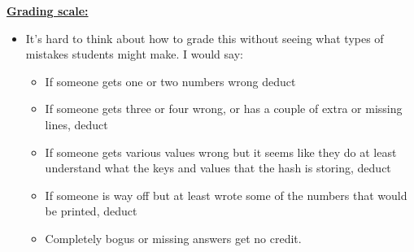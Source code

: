 \documentclass[11pt,fleqn]{article}
\begin{document}
\begin{enumerate}
          \vspace{-2.5mm}

          \begin{info}{\textbf{\underline{Grading scale:}}}

            \begin{itemize}

              \addtolength{\itemsep}{1mm}

              \item It's hard to think about how to grade this without
                    seeing what types of mistakes students might make.  I
                    would say:

                    \vspace{0mm}

                    \begin{itemize}

                      \addtolength{\itemsep}{-.75mm}


                      \item If someone gets one or two numbers wrong deduct

                      \item If someone gets three or four wrong, or has a
                            couple of extra or missing lines, deduct

                      \item If someone gets various values wrong but it
                            seems like they do at least understand what the
                            keys and values that the hash is storing, deduct

                      \item If someone is way off but at least wrote some of
                            the numbers that would be printed, deduct 

                      \item Completely bogus or missing answers get no
                            credit.

                    \end{itemize}

                    \vspace{0mm}


\end{itemize}
\end{info}
\end{enumerate}
\end{document}
